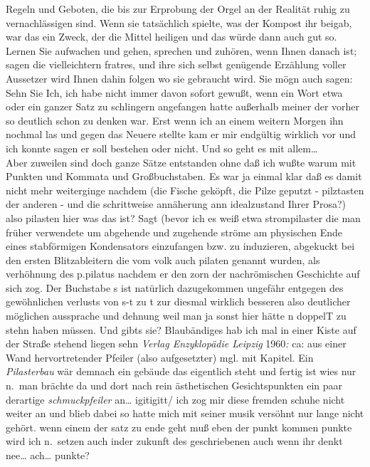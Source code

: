 \documentclass[
]{article}
\begin{document}
Regeln und Geboten, die bis zur Erprobung der Orgel an der Realität
ruhig zu vernachlässigen sind. Wenn sie tatsächlich spielte, was der
Kompost ihr beigab, war das ein Zweck, der die Mittel heiligen und das
würde dann auch gut so.\\
Lernen Sie aufwachen und gehen, sprechen und zuhören, wenn Ihnen danach
ist; sagen die vielleichtern fratres, und ihre sich selbst genügende
Erzählung voller Aussetzer wird Ihnen dahin folgen wo sie gebraucht
wird. Sie mögn auch sagen: Sehn Sie Ich, ich habe nicht immer davon
sofort gewußt, wenn ein Wort etwa oder ein ganzer Satz zu schlingern
angefangen hatte außerhalb meiner der vorher so deutlich schon zu denken
war. Erst wenn ich an einem weitern Morgen ihn nochmal las und gegen das
Neuere stellte kam er mir endgültig wirklich vor und ich konnte sagen er
soll bestehen oder nicht. Und so geht es mit allem\ldots{}\\
Aber zuweilen sind doch ganze Sätze entstanden ohne daß ich wußte warum
mit Punkten und Kommata und Großbuchstaben. Es war ja einmal klar daß es
damit nicht mehr weiterginge nachdem (die Fische geköpft, die Pilze
geputzt - pilztasten der anderen - und die schrittweise annäherung ann
idealzustand Ihrer Prosa?) also pilasten hier was das ist? Sagt (bevor
ich es weiß etwa strompilaster die man früher verwendete um abgehende
und zugehende ströme am physischen Ende eines stabförmigen Kondensators
einzufangen bzw. zu induzieren, abgekuckt bei den ersten Blitzableitern
die vom volk auch pilaten genannt wurden, als verhöhnung des p.pilatus
nachdem er den zorn der nachrömischen Geschichte auf sich zog. Der
Buchstabe s ist natürlich dazugekommen ungefähr entgegen des
gewöhnlichen verlusts von s-t zu t zur diesmal wirklich besseren also
deutlicher möglichen aussprache und dehnung weil man ja sonst hier hätte
n doppelT zu stehn haben müssen. Und gibts sie? Blaubändiges hab ich mal
in einer Kiste auf der Straße stehend liegen sehn \emph{Verlag
Enzyklopädie Leipzig }1960\emph{: }ca: aus einer Wand hervortretender
Pfeiler (also aufgesetzter) mgl. mit Kapitel. Ein \emph{Pilasterbau} wär
demnach ein gebäude das eigentlich steht und fertig ist wies nur n.~man
brächte da und dort nach rein ästhetischen Gesichtspunkten ein paar
derartige \emph{schmuckpfeiler }an\ldots{} igitigitt/ ich zog mir diese
fremden schuhe nicht weiter an und blieb dabei so hatte mich mit seiner
musik versöhnt nur lange nicht gehört. wenn einem der satz zu ende geht
muß eben der punkt kommen punkte wird ich n.~setzen auch inder zukunft
des geschriebenen auch wenn ihr denkt nee\ldots{} ach\ldots{} punkte?
\end{document}
